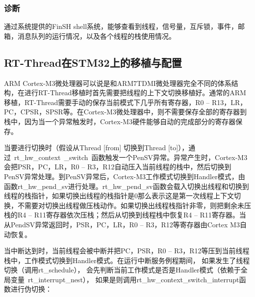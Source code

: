 \subsubsection{诊断}
通{\cf}过系{\cf}统提{\cf}供的{\cf}Fi{\cf}nS{\cf}H {\cf}sh{\cf}el{\cf}l系{\cf}统，{\cf}能够{\cf}查看{\cf}到线{\cf}程，{\cf}信号{\cf}量，{\cf}互斥{\cf}锁，{\cf}事件{\cf}，邮{\cf}箱，{\cf}消息{\cf}队列{\cf}的运{\cf}行情{\cf}况，{\cf}以及{\cf}各个{\cf}线程{\cf}的栈{\cf}使用{\cf}情况。

\subsection{RT-Thread在STM32上的移植与配置}
ARM{\reg} Cortex{\reg}-M3微{\cf}处理{\cf}器可{\cf}以说{\cf}是和{\cf}AR{\cf}M7{\cf}TD{\cf}MI{\cf}微处{\cf}理器{\cf}完全{\cf}不同{\cf}的体{\cf}系结{\cf}构，{\cf}在进{\cf}行R{\cf}T-{\cf}Th{\cf}re{\cf}ad{\cf}移植{\cf}时首{\cf}先需{\cf}要把{\cf}线程{\cf}的上{\cf}下文{\cf}切换{\cf}移植好。通常的ARM移植，RT-Thread需要手动的保存当前模式下几乎所有寄存器，R0 – R13，LR，PC，CPSR，SPSR等。在Cortex{\reg}-M3微处理器中，则不需要保存全部的寄存器到栈中，因为当一个异常触发时，Cortex{\reg}-M3硬件能够自动的完成部分的寄存器保存。

当要进行切换时（假设从Thread [from] 切换到Thread [to]），通过~rt{\_}hw{\_}context~{\_}switch~函数触发一个PenSV异常。异常产生时，Cortex{\reg}-M3会把PSR，PC，LR，R0 – R3，R12自动压入当前线程的栈中，然后切换到PenSV异常处理。到PenSV异常后，Cortex{\reg}-M3工作模式切换到Handler模式，由函数rt{\_}hw{\_}pend{\_}sv进行处理。rt{\_}hw{\_}pend{\_}sv函{\cf}数会{\cf}载入{\cf}切换{\cf}出线{\cf}程和{\cf}切换{\cf}到线{\cf}程的{\cf}栈指{\cf}针，{\cf}如果{\cf}切换{\cf}出线{\cf}程的{\cf}栈指{\cf}针是{\cf}0那{\cf}么表{\cf}示这{\cf}是第{\cf}一次{\cf}线程{\cf}上下{\cf}文切{\cf}换，{\cf}不需{\cf}要对{\cf}切换{\cf}出线{\cf}程做{\cf}压栈{\cf}动作{\cf}。如{\cf}果切{\cf}换出{\cf}线程{\cf}栈指{\cf}针非{\cf}零，{\cf}则把{\cf}剩余{\cf}未压{\cf}栈的{\cf}R4{\cf} –{\cf} R{\cf}11{\cf}寄存{\cf}器依{\cf}次压{\cf}栈；{\cf}然后{\cf}从切{\cf}换到{\cf}线程{\cf}栈中{\cf}恢复{\cf}R4{\cf} –{\cf} R{\cf}11{\cf}寄存{\cf}器。{\cf}当从{\cf}Pe{\cf}nd{\cf}SV{\cf}异常{\cf}返回{\cf}时，{\cf}PS{\cf}R，{\cf}PC{\cf}，L{\cf}R，{\cf}R0{\cf} –{\cf} R{\cf}3，{\cf}R1{\cf}2等{\cf}寄存{\cf}器由Cortex{\reg} M3自动恢复。

当{\cf}中断{\cf}达到{\cf}时，{\cf}当前{\cf}线程{\cf}会被{\cf}中断{\cf}并把{\cf}PC{\cf}，P{\cf}SR{\cf}，R{\cf}0 {\cf}– {\cf}R3{\cf}，R{\cf}12{\cf}等压{\cf}到当{\cf}前线{\cf}程栈{\cf}中，{\cf}工作{\cf}模式{\cf}切换{\cf}到H{\cf}an{\cf}dl{\cf}er{\cf}模式{\cf}。在{\cf}运行{\cf}中断{\cf}服务{\cf}例程{\cf}期间{\cf}， {\cf}如果{\cf}发生{\cf}了线{\cf}程切换（调用rt{\_}schedule）， 会先{\cf}判断{\cf}当前{\cf}工作{\cf}模式{\cf}是否{\cf}是H{\cf}an{\cf}dl{\cf}er{\cf}模式{\cf}（依{\cf}赖于{\cf}全局{\cf}变量~rt{\_}interrupt{\_}nest）， 如{\cf}果是{\cf}则调{\cf}用rt{\_}hw{\_}context{\_}switch{\_}interrupt函数进行伪切换：

